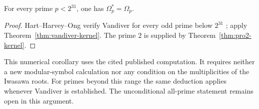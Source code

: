 \begin{corollary}\label{cor:kernel-lt2power31}
For every prime $p<2^{31}$, one has $\Omega_p^*=\Omega_p$.
\end{corollary}

\begin{proof}
Hart--Harvey--Ong verify Vandiver for every odd prime below $2^{31}$
\cite[\S1, item~(2), p.~1]{HartHarveyOng2017}; apply
Theorem~\ref{thm:vandiver-kernel}. The prime $2$ is supplied by
Theorem~\ref{thm:pro2-kernel}.
\end{proof}

This numerical corollary uses the cited published computation. It
requires neither a new modular-symbol calculation nor any condition
on the multiplicities of the Iwasawa roots. For primes beyond this
range the same deduction applies whenever Vandiver is established.
The unconditional all-prime statement remains open in this argument.
